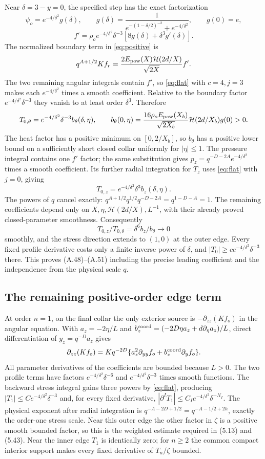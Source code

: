\documentclass[10pt,a4paper]{article}
\newcommand{\hh}{\mathcal H}
\begin{document}
Near $\delta=3-y=0$, the specified step has the exact factorization
\[
\psi_o=e^{-4/\delta^2}g(\delta),\qquad
g(\delta)=\frac1{e^{-(1-\delta/2)^{-2}}+e^{-4/\delta^2}},\qquad g(0)=e,
\]
\[
f'=\rho_oe^{-4/\delta^2}\delta^{-3}[8g(\delta)+\delta^3g'(\delta)].
\]
The normalized boundary term in \eqref{eq:positive} is
\[
q^{A+1/2}Kf_r=\frac{2E_{\rm pow}(X)\hh(2d/X)}{\sqrt{2X}}f'.
\]
The two remaining angular integrals contain $f'$, so \eqref{eq:flat} with
$c=4,j=3$ makes each $e^{-4/\delta^2}$ times a smooth coefficient.
Relative to the boundary factor $e^{-4/\delta^2}\delta^{-3}$ they vanish
to at least order $\delta^3$. Therefore
\[
T_{0,\theta}=e^{-4/\delta^2}\delta^{-3}b_\theta(\delta,\eta),\qquad
b_\theta(0,\eta)=\frac{16\rho_oE_{\rm pow}(X_b)}{\sqrt{2X_b}}
\hh(2d/X_b)g(0)>0.
\]
The heat factor has a positive minimum on $[0,2/X_b]$, so $b_\theta$
has a positive lower bound on a sufficiently short closed collar uniformly
for $|\eta|\le1$.
The pressure integral contains one $f'$ factor; the same substitution gives
$p_z=q^{-D-2A}e^{-4/\delta^2}$ times a smooth coefficient.
Its further radial integration for $T_z$ uses \eqref{eq:flat} with $j=0$,
giving
\[
T_{0,z}=e^{-4/\delta^2}\delta^3b_z(\delta,\eta).
\]
The powers of $q$ cancel exactly:
$q^{A+1/2}q^{1/2}q^{-D-2A}=q^{1-D-A}=1$.
The remaining coefficients depend only on $X,\eta,\hh(2d/X),L^{-1}$,
with their already proved closed-parameter smoothness. Consequently
\[
T_{0,z}/T_{0,\theta}=\delta^6b_z/b_\theta\longrightarrow0
\]
smoothly, and the stress direction extends to $(1,0)$ at the outer edge.
Every fixed profile derivative costs only a finite inverse power of $\delta$,
and $|T_0|\ge ce^{-4/\delta^2}\delta^{-3}$ there.
This proves (A.48)--(A.51) including the precise leading coefficient and
the independence from the physical scale $q$.

\subsection{The remaining positive-order edge term}
At order $n=1$, on the final collar the only exterior source is
$-\partial_{zz}(Kf_o)$ in the angular equation. With
$a_z=-2\eta/L$ and
$b_z^{\rm coord}=(-2D\eta a_z+d\partial_\eta a_z)/L$,
direct differentiation of $y_z=q^{-D}a_z$ gives
\[
\partial_{zz}(Kf_o)=Kq^{-2D}
\{a_z^2\partial_{yy}f_o+b_z^{\rm coord}\partial_yf_o\}.
\]
All parameter derivatives of the coefficients are bounded because $L>0$.
The two profile terms have factors
$e^{-4/\delta^2}\delta^{-6}$ and $e^{-4/\delta^2}\delta^{-3}$ times
smooth functions. The backward stress integral gains three powers by
\eqref{eq:flat}, producing
$|T_1|\le Ce^{-4/\delta^2}\delta^{-3}$ and, for every fixed derivative,
$|\partial^IT_1|\le C_Ie^{-4/\delta^2}\delta^{-N_I}$.
The physical exponent after radial integration is
$q^{-A-2D+1/2}=q^{-A-1/2+2h}$, exactly the order-one stress scale.
Near this outer edge the other factor in $\zeta$ is a positive smooth bounded
factor, so this is the weighted estimate required in (5.13) and (5.43).
Near the inner edge $T_1$ is identically zero; for $n\ge2$ the common compact
interior support makes every fixed derivative of $T_n/\zeta$ bounded.
\end{document}
